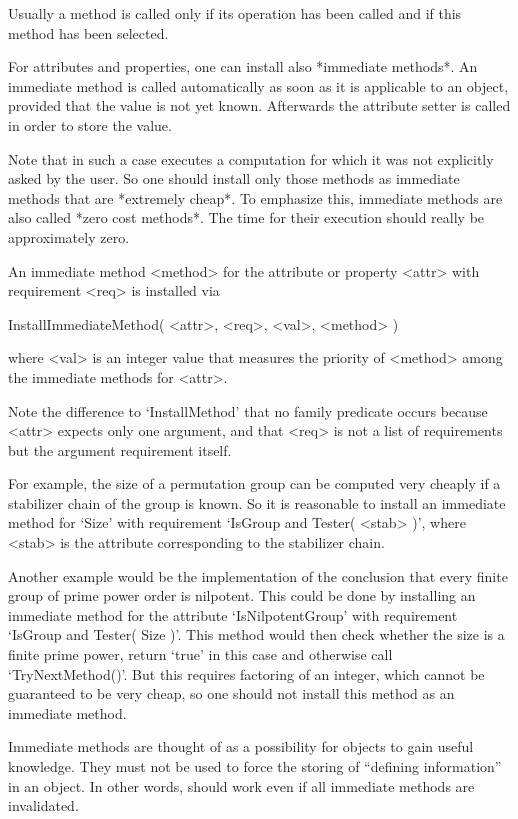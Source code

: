 
Usually a method is called only if its operation has been called
and if this method has been selected.

For attributes and properties, one can install also *immediate methods*.
An immediate method is called automatically as soon as it is applicable
to an object, provided that the value is not yet known.
Afterwards the attribute setter is called in order to store the value.

Note that in such a case {\GAP} executes a computation for which
it was not explicitly asked by the user.
So one should install only those methods as immediate methods
that are *extremely cheap*.
To emphasize this, immediate methods are also called *zero cost methods*.
The time for their execution should really be approximately zero.

An immediate method <method> for the attribute or property <attr>
with requirement <req> is installed via

\>InstallImmediateMethod( <attr>, <req>, <val>, <method> )

where <val> is an integer value that measures the priority of <method>
among the immediate methods for <attr>.

Note the difference to `InstallMethod' that no family predicate occurs
because <attr> expects only one argument,
and that <req> is not a list of requirements but the argument requirement
itself.

For example, the size of a permutation group can be computed very cheaply
if a stabilizer chain of the group is known.
So it is reasonable to install an immediate method for `Size' with
requirement `IsGroup and Tester( <stab> )',
where <stab> is the attribute corresponding to the stabilizer chain.

Another example would be the implementation of the conclusion that
every finite group of prime power order is nilpotent.
This could be done by installing an immediate method for the attribute
`IsNilpotentGroup' with requirement `IsGroup and Tester( Size )'.
This method would then check whether the size is a finite prime power,
return `true' in this case and otherwise call `TryNextMethod()'.
But this requires factoring of an integer,
which cannot be guaranteed to be very cheap,
so one should not install this method as an immediate method.

Immediate methods are thought of as a possibility for objects to gain
useful knowledge.
They must not be used to force the storing of ``defining information''
in an object.
In other words, {\GAP} should work even if all immediate methods are
invalidated.

